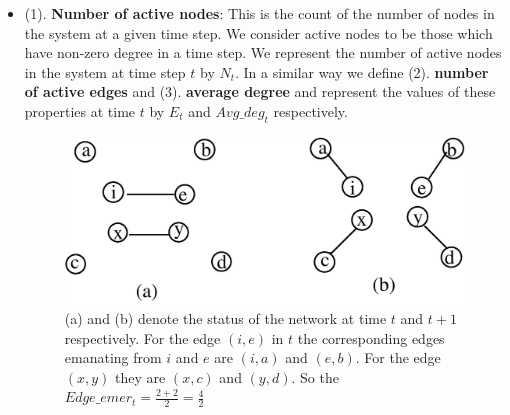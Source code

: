  \begin{itemize} 
  \item (1). {\bf  Number of active nodes}: This is the count of the number of nodes in the system at a given time step. We consider active nodes to be those which have non-zero degree in a time step. We represent the number of active nodes in the system at time step {$t$} by {$N_{t}$}.
  In a similar way we define (2). {\bf number of active edges} and (3). {\bf average degree} and represent the values of these properties at time $t$ by $E_t$ and $Avg\_deg_{t}$ respectively.

\begin{figure}[h]
 \begin{center}
 
 \includegraphics[width=0.7\columnwidth, angle=0]{./texfiles/Chapter_1/fig/ede_em-eps-converted-to.pdf}
 \caption{\label{fig3}(a) and (b) denote the status of the network at time $t$ and $t+1$ respectively. For the edge $(i,e)$ in $t$ the corresponding edges
 emanating from $i$ and $e$ are $(i,a)$ and $(e,b)$. For the edge $(x,y)$ they are $(x,c)$ and $(y,d)$. So the $Edge\_emer_{t}=\frac{2+2}{2}=\frac{4}{2}$}
 

\end{center}
\end{figure}
\end{itemize}
